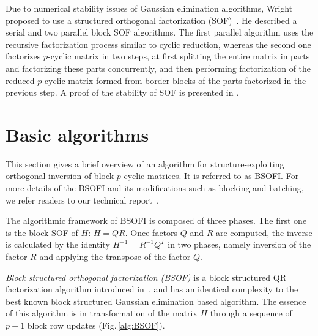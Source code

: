 \documentclass{llncs}
\begin{document}
Due to numerical stability issues of Gaussian elimination algorithms, 
Wright proposed to use a structured orthogonal 
factorization (SOF)~\cite{Wright92BSOF}.
He described a serial and two parallel block SOF algorithms. 
The first parallel algorithm uses the recursive factorization 
process similar to cyclic reduction,
whereas the second one factorizes $p$-cyclic matrix in two steps,
at first splitting the entire matrix in parts and factorizing these 
parts concurrently, and then performing factorization of the reduced 
$p$-cyclic matrix formed from border blocks of the parts factorized 
in the previous step.  A proof of the stability of 
SOF is presented in \cite{Wright92BSOF}.

\section{Basic algorithms}
\label{sec:algorithm}

This section gives a brief overview of an algorithm for 
structure-exploiting orthogonal inversion 
of block $p$-cyclic matrices. It is referred to as BSOFI. 
For more details of the BSOFI and its modifications such as blocking and batching, 
we refer readers to our technical report~\cite{GogolenkoBai13}.

The algorithmic framework of BSOFI is composed of three phases. 
The first one is the block SOF of $H$: $H = QR$.
Once factors $Q$ and $R$ are computed, 
the inverse is calculated by the identity $H^{-1} = R^{-1}Q^T$
in two phases, namely inversion of the factor $R$ 
and applying the transpose of the factor $Q$.

\textit{Block structured orthogonal factorization (BSOF)} 
is a block structured QR factorization algorithm introduced 
in~\cite{Wright92BSOF}, and has an identical complexity to the best known 
block structured Gaussian elimination based algorithm. 
The essence of this algorithm is 
in transformation of the matrix $H$ 
through a sequence of $p-1$ block row updates (Fig.\,\ref{alg:BSOF}). 
\end{document}
